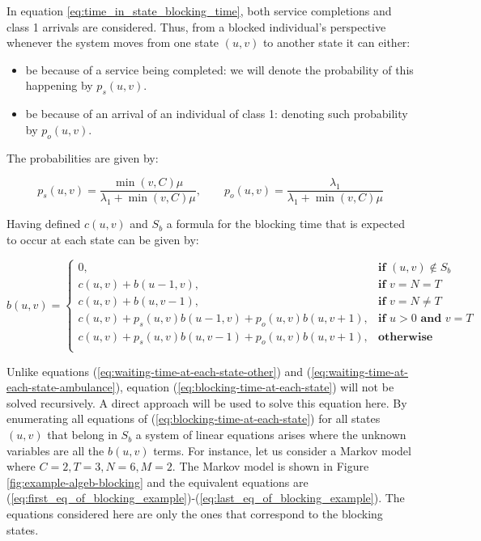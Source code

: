 In equation \ref{eq:time_in_state_blocking_time}, both service completions and 
class 1 arrivals are considered. 
Thus, from a blocked individual's perspective whenever the system moves from one 
state \((u,v)\)
to another state it can either:

\begin{itemize}
    \item be because of a service being completed: we will denote the probability 
    of this happening by \(p_s(u,v)\). 
    \item be because of an arrival of an individual of class 1: denoting such 
    probability by \(p_o(u,v)\).
\end{itemize}
The probabilities are given by:

\begin{equation*}
    p_s(u,v) = \frac{\min(v,C)\mu}{\lambda_1 + \min(v,C)\mu}, \qquad
    p_o(u,v) = \frac{\lambda_1}{\lambda_1 + \min(v,C)\mu}
\end{equation*}


Having defined \(c(u,v)\) and \(S_b\) a formula for the blocking time that is
expected to occur at each state can be given by:

\begin{equation}\label{eq:blocking-time-at-each-state}
    b(u,v) = 
    \begin{cases} 
        0, & \textbf{if } (u,v) \notin S_b \\
        c(u,v) + b(u - 1, v), & \textbf{if } v = N = T\\
        c(u,v) + b(u, v-1), & \textbf{if } v = N \neq T \\
        c(u,v) + p_s(u,v) b(u-1, v) + p_o(u,v) b(u, v+1), & \textbf{if } u > 0 
        \textbf{ and } v = T \\
        c(u,v) + p_s(u,v) b(u, v-1) + p_o(u,v) b(u, v+1), & \textbf{otherwise} \\
    \end{cases}
\end{equation}

Unlike equations (\ref{eq:waiting-time-at-each-state-other}) and 
(\ref{eq:waiting-time-at-each-state-ambulance}), equation 
(\ref{eq:blocking-time-at-each-state}) will not be solved recursively. 
A direct approach will be used to solve this equation here. 
By enumerating all equations of (\ref{eq:blocking-time-at-each-state}) for all 
states \((u,v)\) that belong in \(S_b\) 
a system of linear equations arises where the unknown variables are all the \(b(u,v)\)
terms.
For instance, let us consider a Markov model where \(C=2, T=3, N=6, M=2\). 
The Markov model is shown in Figure \ref{fig:example-algeb-blocking}
and the equivalent equations are 
(\ref{eq:first_eq_of_blocking_example})-(\ref{eq:last_eq_of_blocking_example}).
The equations considered here are only the ones that correspond to the blocking 
states.


